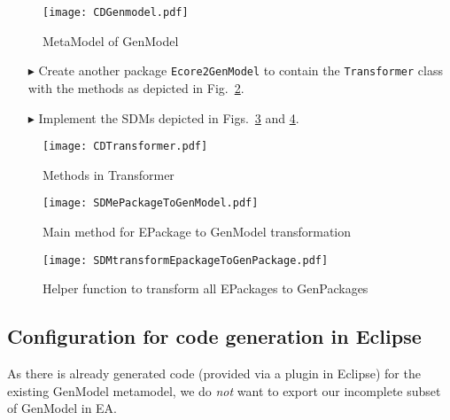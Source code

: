 \begin{figure}[htbp]
\begin{center}  
	\texttt{[image: CDGenmodel.pdf]}
	\caption{MetaModel of GenModel}  
\label{fig_gMM}
\end{center}
\end{figure} 

\begin{enumerate}  
\item[$\blacktriangleright$] Create another package \texttt{Ecore2GenModel} to contain the \texttt{Transformer} class with the methods as depicted in
Fig.~\ref{fig_e2gm}.

\item[$\blacktriangleright$] Implement the SDMs depicted in Figs.~\ref{fig_pack2gm} and \ref{fig_transf}.
\end{enumerate}

\begin{figure}[htbp]
\begin{center}  
\texttt{[image: CDTransformer.pdf]}
\caption{Methods in \textsf{Transformer}}  
\label{fig_e2gm}
\end{center}
\end{figure} 

\begin{figure}[htbp]
\begin{center}  \texttt{[image: SDMePackageToGenModel.pdf]}
        \caption{Main method for \textsf{EPackage} to \textsf{GenModel} transformation}  
  \label{fig_pack2gm}
\end{center}
\end{figure} 

\begin{figure}[htbp]
\begin{center}  
\texttt{[image: SDMtransformEpackageToGenPackage.pdf]}
\caption{Helper function to transform all \textsf{EPackages} to \textsf{GenPackages}}  
\label{fig_transf}
\end{center}
\end{figure} 



\subsection{Configuration for code generation in Eclipse}
\label{sec:Project Combination}
\genHeader

As there is already generated code (provided via a plugin in Eclipse) for the existing \textsf{GenModel} metamodel, we do \emph{not} want to export our
incomplete subset of \textsf{GenModel} in EA.

